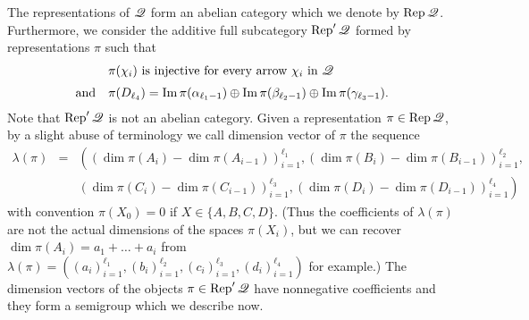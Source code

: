 \documentclass[12pt,reqno]{amsart}
\begin{document}
The representations of $\mathscr{Q}$
form an abelian category which we denote by $\Rep\quiver$.
Furthermore, we consider the additive full subcategory $\Rep'\quiver$ formed by representations $\pi$ such that
%
\begin{equation}
\label{repQ'}
\begin{array}{ll}
 & \mbox{$\pi(\chi_i)$ is injective for every arrow $\chi_i$ in $\mathscr{Q}$}
\\[2mm]
\text{and}
&
\pi(D_{\ell_4})=\mathrm{Im}\,\pi(\alpha_{\ell_1-1})\oplus \mathrm{Im}\,\pi(\beta_{\ell_2-1})
\oplus \mathrm{Im}\,\pi(\gamma_{\ell_3-1}).
\end{array}
\end{equation}
%
Note that $ \Rep'\quiver$ is not an abelian category.
Given a representation $\pi\in\Rep \quiver$,
by a slight abuse of terminology
we call dimension vector of $\pi$
the sequence
\begin{eqnarray*}
\lambda(\pi)
 & = &
\left(
\left(\dim\pi(A_i)-\dim\pi(A_{i-1})\right)_{i=1}^{\ell_1},
\left(\dim\pi(B_i)-\dim\pi(B_{i-1})\right)_{i=1}^{\ell_2},
\right.
\\
 & &
\left.
\left(\dim\pi(C_i)-\dim\pi(C_{i-1})\right)_{i=1}^{\ell_3},
\left(\dim\pi(D_i)-\dim\pi(D_{i-1})\right)_{i=1}^{\ell_4}
\right)
\end{eqnarray*}
with convention $\pi(X_0)=0$ if $X\in\{A,B,C,D\}$.
(Thus the coefficients of $\lambda(\pi)$ are not the actual dimensions of the spaces $\pi(X_i)$,
but we can recover $\dim \pi(A_i)=a_1+\dots+a_i$ from
$\lambda(\pi)=\left((a_i)_{i=1}^{\ell_1}, (b_i)_{i=1}^{\ell_2},(c_i)_{i=1}^{\ell_3},(d_i)_{i=1}^{\ell_4}\right)$ for example.)
The dimension vectors of the objects $\pi\in\Rep'\quiver$ have nonnegative coefficients and they
form a semigroup which we describe now.
\end{document}
